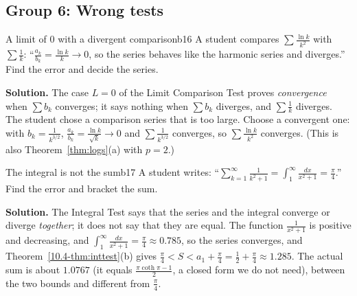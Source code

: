 \documentclass[11pt]{article}
\begin{document}
\subsection*{Group 6: Wrong tests}

\begin{exmp}{A limit of $0$ with a divergent comparison}{b16}
A student compares $\sum\frac{\ln k}{k^2}$ with $\sum\frac1k$: ``$\frac{a_k}{b_k}=\frac{\ln k}k\to0$, so the series behaves like the harmonic series and diverges.'' Find the error and decide the series.

\textbf{Solution.} The case $L=0$ of the Limit Comparison Test proves \emph{convergence} when $\sum b_k$ converges; it says nothing when $\sum b_k$ diverges, and $\sum\frac1k$ diverges. The student chose a comparison series that is too large. Choose a convergent one: with $b_k=\frac1{k^{3/2}}$, $\frac{a_k}{b_k}=\frac{\ln k}{\sqrt k}\to0$ and $\sum\frac1{k^{3/2}}$ converges, so $\sum\frac{\ln k}{k^2}$ converges. (This is also Theorem~\ref{thm:logs}(a) with $p=2$.)
\end{exmp}

\begin{exmp}{The integral is not the sum}{b17}
A student writes: ``$\sum_{k=1}^\infty\frac1{k^2+1}=\int_1^\infty\frac{dx}{x^2+1}=\frac\pi4$.'' Find the error and bracket the sum.

\textbf{Solution.} The Integral Test says that the series and the integral converge or diverge \emph{together}; it does not say that they are equal. The function $\frac1{x^2+1}$ is positive and decreasing, and $\int_1^\infty\frac{dx}{x^2+1}=\frac\pi4\approx0.785$, so the series converges, and Theorem~\ref{10.4-thm:inttest}(b) gives $\frac\pi4<S<a_1+\frac\pi4=\frac12+\frac\pi4\approx1.285$. The actual sum is about $1.0767$ (it equals $\frac{\pi\coth\pi-1}2$, a closed form we do not need), between the two bounds and different from $\frac\pi4$.
\end{exmp}
\end{document}

